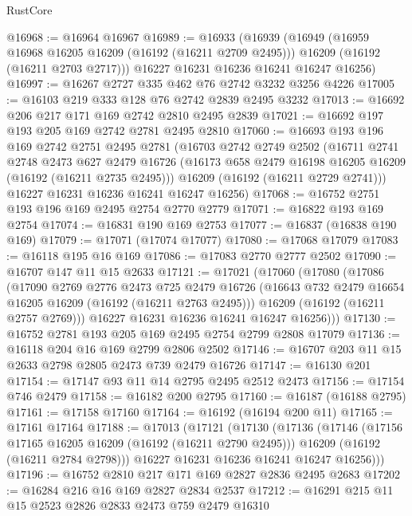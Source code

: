 \begin{lexlean}{RustCore}
\begin{coremodule}
@16968 := @16964 @16967
@16989 := @16933
    (@16939
      (@16949
        (@16959 @16968 @16205 @16209 (@16192 (@16211 @2709 @2495)))
        @16209
        (@16192 (@16211 @2703 @2717)))
      @16227
      @16231
      @16236
      @16241
      @16247
      @16256)
@16997 := @16267 @2727 @335 @462 @76 @2742 @3232 @3256 @4226
@17005 := @16103 @219 @333 @128 @76 @2742 @2839 @2495 @3232
@17013 := @16692 @206 @217 @171 @169 @2742 @2810 @2495 @2839
@17021 := @16692 @197 @193 @205 @169 @2742 @2781 @2495 @2810
@17060 := @16693
    @193
    @196
    @169
    @2742
    @2751
    @2495
    @2781
    (@16703
      @2742
      @2749
      @2502
      (@16711
        @2741
        @2748
        @2473
        @627
        @2479
        @16726
        (@16173 @658 @2479 @16198 @16205 @16209 (@16192 (@16211 @2735 @2495)))
        @16209
        (@16192 (@16211 @2729 @2741)))
      @16227
      @16231
      @16236
      @16241
      @16247
      @16256)
@17068 := @16752 @2751 @193 @196 @169 @2495 @2754 @2770 @2779
@17071 := @16822 @193 @169 @2754
@17074 := @16831 @190 @169 @2753
@17077 := @16837 (@16838 @190 @169)
@17079 := @17071 (@17074 @17077)
@17080 := @17068 @17079
@17083 := @16118 @195 @16 @169
@17086 := @17083 @2770 @2777 @2502
@17090 := @16707 @147 @11 @15 @2633
@17121 := @17021
    (@17060
      (@17080
        (@17086
          (@17090
            @2769
            @2776
            @2473
            @725
            @2479
            @16726
            (@16643 @732 @2479 @16654 @16205 @16209 (@16192 (@16211 @2763 @2495)))
            @16209
            (@16192 (@16211 @2757 @2769)))
          @16227
          @16231
          @16236
          @16241
          @16247
          @16256)))
@17130 := @16752 @2781 @193 @205 @169 @2495 @2754 @2799 @2808 @17079
@17136 := @16118 @204 @16 @169 @2799 @2806 @2502
@17146 := @16707 @203 @11 @15 @2633 @2798 @2805 @2473 @739 @2479 @16726
@17147 := @16130 @201
@17154 := @17147 @93 @11 @14 @2795 @2495 @2512 @2473
@17156 := @17154 @746 @2479
@17158 := @16182 @200 @2795
@17160 := @16187 (@16188 @2795)
@17161 := @17158 @17160
@17164 := @16192 (@16194 @200 @11)
@17165 := @17161 @17164
@17188 := @17013
    (@17121
      (@17130
        (@17136
          (@17146
            (@17156 @17165 @16205 @16209 (@16192 (@16211 @2790 @2495)))
            @16209
            (@16192 (@16211 @2784 @2798)))
          @16227
          @16231
          @16236
          @16241
          @16247
          @16256)))
@17196 := @16752 @2810 @217 @171 @169 @2827 @2836 @2495 @2683
@17202 := @16284 @216 @16 @169 @2827 @2834 @2537
@17212 := @16291 @215 @11 @15 @2523 @2826 @2833 @2473 @759 @2479 @16310

\end{coremodule}
\end{lexlean}
